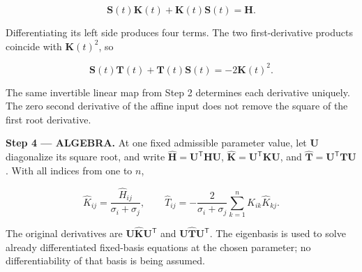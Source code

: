\documentclass[11pt,oneside,openany]{book}
\begin{document}
\[
\mathbf S(t)\mathbf K(t)+\mathbf K(t)\mathbf S(t)=\mathbf H.
\]

Differentiating its left side produces four terms. The two first-derivative products coincide with \(\mathbf K(t)^2\), so

\[
\mathbf S(t)\mathbf T(t)+\mathbf T(t)\mathbf S(t)=-2\mathbf K(t)^2.
\]

The same invertible linear map from Step 2 determines each derivative uniquely. The zero second derivative of the affine input does not remove the square of the first root derivative.

\begingroup\color{AlgebraBlue}
\textbf{Step 4 --- ALGEBRA.} At one fixed admissible parameter value, let \(\mathbf U\) diagonalize its square root, and write \(\widehat{\mathbf H}=\mathbf U^{\mathsf T}\mathbf H\mathbf U\), \(\widehat{\mathbf K}=\mathbf U^{\mathsf T}\mathbf K\mathbf U\), and \(\widehat{\mathbf T}=\mathbf U^{\mathsf T}\mathbf T\mathbf U\). With all indices from one to \(n\),

\[
\widehat K_{ij}=\frac{\widehat H_{ij}}{\sigma_i+\sigma_j},\qquad
\widehat T_{ij}=-\frac{2}{\sigma_i+\sigma_j}
\sum_{k=1}^n\widehat K_{ik}\widehat K_{kj}.
\]

The original derivatives are \(\mathbf U\widehat{\mathbf K}\mathbf U^{\mathsf T}\) and \(\mathbf U\widehat{\mathbf T}\mathbf U^{\mathsf T}\). The eigenbasis is used to solve already differentiated fixed-basis equations at the chosen parameter; no differentiability of that basis is being assumed.
\end{document}
